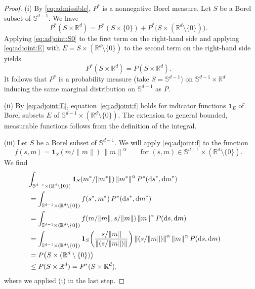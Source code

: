\documentclass{aptpubarxiv}
\numberwithin{equation}{section}
\begin{document}
\begin{proof}
(i) By \eqref{eq:admissible}, $P^*$ is a nonnegative Borel measure. Let $S$ be a Borel subset of $\mathbb{S}^{d-1}$. We have
\[
  P^*( S \times {\mathbb{R}}^d ) = P^*( S \times \{ 0 \} ) + P^*\bigl( S \times ({\mathbb{R}}^d \setminus \{ 0 \}) \bigr).
\]
Applying \eqref{eq:adjoint:S0} to the first term on the right-hand side and applying \eqref{eq:adjoint:E} with $E = S \times ({\mathbb{R}}^d \setminus \{ 0 \})$ to the second term on the right-hand side yields
\[
  P^*( S \times {\mathbb{R}}^d ) = P( S \times {\mathbb{R}}^d ).
\]
It follows that $P^*$ is a probability measure (take $S = \mathbb{S}^{d-1}$) on $\mathbb{S}^{d-1} \times {\mathbb{R}}^d$ inducing the same marginal distribution on $\mathbb{S}^{d-1}$ as $P$.

(ii) By \eqref{eq:adjoint:E}, equation~\eqref{eq:adjoint:f} holds for indicator functions ${\boldsymbol{1}}_E$ of Borel subsets $E$ of $\mathbb{S}^{d-1} \times ({\mathbb{R}}^d \setminus \{ 0 \})$. The extension to general bounded, measurable functions follows from the definition of the integral.

(iii) Let $S$ be a Borel subset of $\mathbb{S}^{d-1}$. We will apply \eqref{eq:adjoint:f} to the function
\[
  f(s, m) = {\boldsymbol{1}}_S( m / {\|{m}\|} ) \, {\|{m}\|}^\alpha \qquad \text{for $(s, m) \in \mathbb{S}^{d-1} \times ({\mathbb{R}}^d \setminus \{ 0 \})$}.
\]
We find
\begin{align*}
  \lefteqn{
  \int_{ \mathbb{S}^{d-1} \times ({\mathbb{R}}^d \setminus \{ 0 \}) } {\boldsymbol{1}}_S( m^* / {\|{m^*}\|} ) \, {\|{m^*}\|}^\alpha \, P^*({\mathrm{d}s}^*, {\mathrm{d}m}^*)
  } \\
  &= \int_{ \mathbb{S}^{d-1} \times ({\mathbb{R}}^d \setminus \{ 0 \}) } f( s^*, m^* ) \, P^*({\mathrm{d}s}^*, {\mathrm{d}m}^*) \\
  &= \int_{ \mathbb{S}^{d-1} \times ({\mathbb{R}}^d \setminus \{ 0 \}) } f( m / {\|{m}\|}, s / {\|{m}\|} ) \, {\|{m}\|}^\alpha \, P({\mathrm{d}s}, {\mathrm{d}m}) \\
  &= \int_{ \mathbb{S}^{d-1} \times ({\mathbb{R}}^d \setminus \{ 0 \}) } {\boldsymbol{1}}_S \biggl( \frac{s / {\|{m}\|}}{{\|{(s / {\|{m}\|})}\|}} \biggr) \, {\|{(s / {\|{m}\|})}\|}^\alpha \, {\|{m}\|}^\alpha \, P({\mathrm{d}s}, {\mathrm{d}m}) \\
  &= P \bigl( S \times ( {\mathbb{R}}^d \setminus \{ 0 \} ) \bigr) \\
  &\le P ( S \times {\mathbb{R}}^d ) = P^* ( S \times {\mathbb{R}}^d ),
\end{align*}
where we applied (i) in the last step.


\end{proof}
\end{document}
